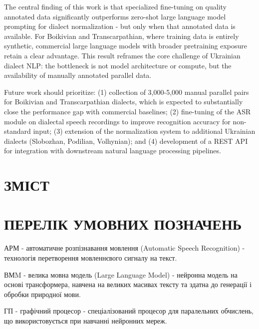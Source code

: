 \documentclass[14pt]{extarticle}
\let\oldaddcontentsline\addcontentsline
\renewcommand{\addcontentsline}[3]{\phantomsection\oldaddcontentsline{#1}{#2}{#3}}
\begin{document}
The central finding of this work is that specialized fine-tuning on quality annotated data
significantly outperforms zero-shot large language model prompting for dialect normalization -
but only when that annotated data is available. For Boikivian and Transcarpathian, where training
data is entirely synthetic, commercial large language models with broader pretraining exposure
retain a clear advantage. This result reframes the core challenge of Ukrainian dialect NLP:
the bottleneck is not model architecture or compute, but the availability of manually annotated
parallel data.

Future work should prioritize: (1) collection of 3,000-5,000 manual parallel pairs for Boikivian
and Transcarpathian dialects, which is expected to substantially close the performance gap with
commercial baselines; (2) fine-tuning of the ASR module on dialectal speech recordings to improve
recognition accuracy for non-standard input; (3) extension of the normalization system to
additional Ukrainian dialects (Slobozhan, Podilian, Volhynian); and (4) development of a REST API
for integration with downstream natural language processing pipelines.

\clearpage

\section*{ЗМІСТ}
\renewcommand{\contentsname}{}
\vspace{-2\baselineskip}
\tableofcontents

\clearpage

\section*{ПЕРЕЛІК УМОВНИХ ПОЗНАЧЕНЬ}

АРМ - автоматичне розпізнавання мовлення (Automatic Speech Recognition) - технологія перетворення мовленнєвого сигналу на текст.

ВМM - велика мовна модель (Large Language Model) - нейронна модель на основі трансформера, навчена на великих масивах тексту та здатна до генерації і обробки природної мови.

ГП - графічний процесор - спеціалізований процесор для паралельних обчислень, що використовується при навчанні нейронних мереж.
\end{document}
